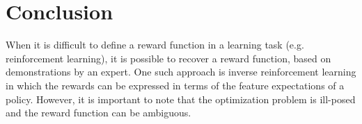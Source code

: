 \documentclass[10pt,a4paper,twocolumn]{article}
\begin{document}
\section{Conclusion}
When it is difficult to define a reward function in a learning task (e.g. reinforcement learning), it is possible to recover a reward function, based on demonstrations by an expert. One such approach is inverse reinforcement learning in which the rewards can be expressed in terms of the feature expectations of a policy. However, it is important to note that the optimization problem is ill-posed and the reward function can be ambiguous.

\newpage

 

\end{document}
